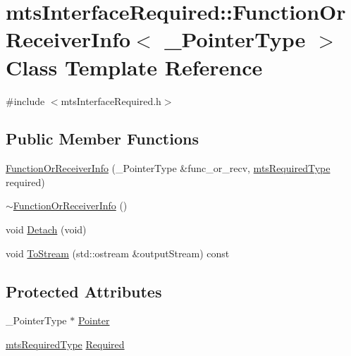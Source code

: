 \hypertarget{classmts_interface_required_1_1_function_or_receiver_info}{}\section{mts\+Interface\+Required\+:\+:Function\+Or\+Receiver\+Info$<$ \+\_\+\+Pointer\+Type $>$ Class Template Reference}
\label{classmts_interface_required_1_1_function_or_receiver_info}


{\ttfamily \#include $<$mts\+Interface\+Required.\+h$>$}

\subsection*{Public Member Functions}
\begin{DoxyCompactItemize}
\item 
\hyperlink{classmts_interface_required_1_1_function_or_receiver_info_a7c68f26b12ce32d671cf19337b2258cc}{Function\+Or\+Receiver\+Info} (\+\_\+\+Pointer\+Type \&func\+\_\+or\+\_\+recv, \hyperlink{mts_forward_declarations_8h_a9ef1ce54724afde7802db326ff8606f3}{mts\+Required\+Type} required)
\item 
\hyperlink{classmts_interface_required_1_1_function_or_receiver_info_a4d3a617eeadc9352a99cea50c414aa5a}{$\sim$\+Function\+Or\+Receiver\+Info} ()
\item 
void \hyperlink{classmts_interface_required_1_1_function_or_receiver_info_a83943d97434e35c85e547a34eff22f59}{Detach} (void)
\item 
void \hyperlink{classmts_interface_required_1_1_function_or_receiver_info_a87ede0d4d1fa02c6d19f40ec2bef7c45}{To\+Stream} (std\+::ostream \&output\+Stream) const 
\end{DoxyCompactItemize}
\subsection*{Protected Attributes}
\begin{DoxyCompactItemize}
\item 
\+\_\+\+Pointer\+Type $\ast$ \hyperlink{classmts_interface_required_1_1_function_or_receiver_info_ab4394777d1e10c3d4ea888e0d5d90d85}{Pointer}
\item 
\hyperlink{mts_forward_declarations_8h_a9ef1ce54724afde7802db326ff8606f3}{mts\+Required\+Type} \hyperlink{classmts_interface_required_1_1_function_or_receiver_info_a6459b7ea33ff75f81cc0c48e1c12cc3a}{Required}
\end{DoxyCompactItemize}
